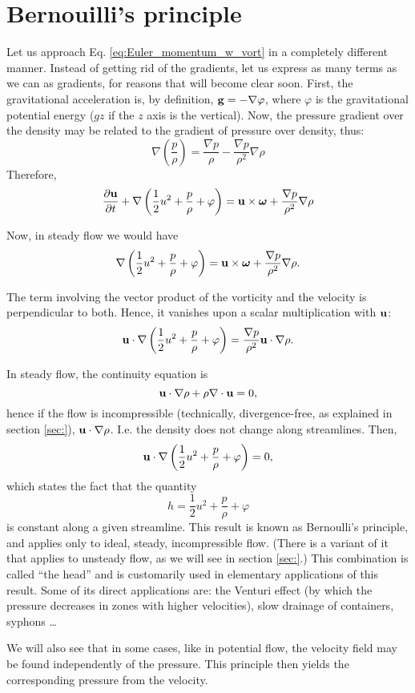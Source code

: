 \section{Bernouilli's principle}

Let us approach Eq. \ref{eq:Euler_momentum_w_vort} in a completely
different manner. Instead of getting rid of the gradients, let us
express as many terms as we can as gradients, for reasons that will
become clear soon. First, the gravitational acceleration is, by
definition, $\mathbf{g} = -\nabla\varphi$, where $\varphi $ is the
gravitational potential energy ($g z$ if the $z$ axis is the
vertical). Now, the pressure gradient over the density may be related
to the gradient of pressure over density, thus:
\[
\nabla
\left(
\frac{p}{\rho}
\right) =
\frac{ \nabla p }{\rho} -
\frac{ \nabla p }{\rho^2} \nabla \rho 
\]
Therefore,
\[
\frac{\partial \mathbf{u} }{\partial t} +
 \nabla
\left(
\frac12 u^2 +
\frac{p}{\rho} +
\varphi
\right)
=
  \mathbf{u} \times\bm{\omega} +
 \frac{ \nabla p }{\rho^2} \nabla \rho 
\]

Now, in steady flow we would have
\[
\nabla
\left(
\frac12 u^2 +
\frac{p}{\rho} +
\varphi
\right)
=
  \mathbf{u} \times\bm{\omega} +
 \frac{ \nabla p }{\rho^2} \nabla \rho  .
\]

The term involving the vector product of the vorticity and the
velocity is perpendicular to both. Hence, it vanishes upon a scalar
multiplication with $\mathbf{u}$:
\[
\mathbf{u}\cdot
\nabla
\left(
\frac12 u^2 +
\frac{p}{\rho} +
\varphi
\right)
=
\frac{ \nabla p }{\rho^2} \mathbf{u}\cdot \nabla \rho  .
\]
 
In steady flow, the continuity equation is
\[
\mathbf{u}\cdot \nabla \rho  +
\rho \nabla \cdot \mathbf{u} = 0 ,
\]
hence if the flow is incompressible (technically, divergence-free, as
explained in section \ref{sec:}), $\mathbf{u}\cdot \nabla \rho $. I.e. the
density does not change along streamlines. Then,
\[
\mathbf{u}\cdot
\nabla
\left(
\frac12 u^2 +
\frac{p}{\rho} +
\varphi
\right)
=
0 ,
\]
which states the fact that the quantity
\[
h = \frac12 u^2 + \frac{p}{\rho} + \varphi
\]
is constant along a given streamline. This result is known as
Bernoulli's principle, and applies only to ideal, steady,
incompressible flow. (There is a variant of it that applies to
unsteady flow, as we will see in section \ref{sec:}.)
%
This combination is called ``the head'' and is customarily used in
elementary applications of this result. Some of its direct
applications are: the Venturi effect (by which the pressure decreases
in zones with higher velocities), slow drainage of containers, syphons
\ldots

We will also see that in some cases, like in potential flow, the
velocity field may be found independently of the pressure. This
principle then yields the corresponding pressure from the velocity.


